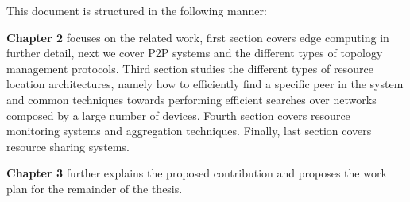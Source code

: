 This document is structured in the following manner:

\textbf{Chapter 2} focuses on the related work, first section covers edge computing in further detail, next we cover P2P systems and the different types of topology management protocols. Third section studies the different types of resource location architectures, namely how to efficiently find a specific peer in the system and common techniques towards performing efficient searches over networks composed by a large number of devices. Fourth section covers resource monitoring systems and aggregation techniques. Finally, last section covers resource sharing systems.

\textbf{Chapter 3} further explains the proposed contribution and proposes the work plan for the remainder of the thesis. 

